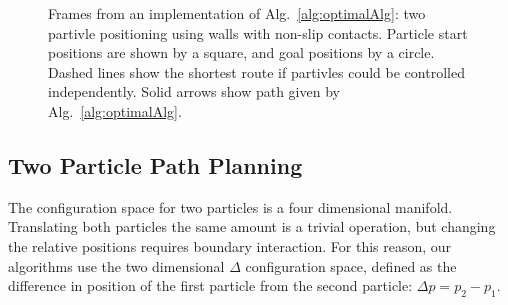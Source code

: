 \begin{figure*}

\vspace{-1em}
\caption{\label{fig:shapeControlMathematica1}{Frames from an implementation of Alg.\ \ref{alg:optimalAlg}: two partivle positioning using walls with non-slip contacts. 
Particle start positions are shown by a square, and goal positions by a circle.  Dashed lines show the shortest route if partivles could be controlled independently.  Solid arrows show path given by  Alg.\ \ref{alg:optimalAlg}.
}
\vspace{-1em}
}
\end{figure*}


\subsection{Two Particle Path Planning}


The configuration space for two particles is a four dimensional manifold. Translating both particles the same amount is a trivial operation, but changing the relative positions requires boundary interaction. For this reason, our algorithms use the two dimensional $\Delta$ configuration space, defined as the difference in position of the first particle from the second particle: $\Delta p = p_2 - p_1$.
 
